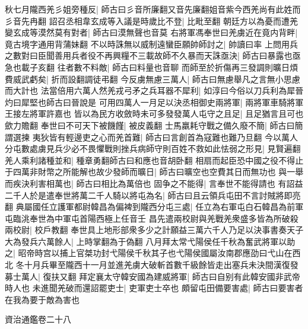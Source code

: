 秋七月隴西羌彡姐旁種反|{
	師古曰彡音所廉翻又音先廉翻姐音紫今西羌尚有此姓而彡音先冉翻}
詔召丞相韋玄成等入議是時歲比不登|{
	比毗至翻}
朝廷方以為憂而遭羌變玄成等漠然莫有對者|{
	師古曰漠無聲也音莫}
右將軍馮奉世曰羌虜近在竟内背畔|{
	竟古境字通用背蒲妹翻}
不以時誅無以威制遠蠻臣願帥師討之|{
	帥讀曰率}
上問用兵之數對曰臣聞善用兵者役不再興糧不三載故師不久暴而天誅亟決|{
	師古曰暴露也亟急也載子亥翻}
往者數不料敵|{
	師古曰料量也音聊}
而師至於折傷再三發調則曠日煩費威武虧矣|{
	折而設翻調徒弔翻}
今反虜無慮三萬人|{
	師古曰無慮舉凡之言無小思慮而大計也}
法當倍用六萬人然羌戎弓矛之兵耳器不犀利|{
	如淳曰今俗以刀兵利為犀晉灼曰犀堅也師古曰晉說是}
可用四萬人一月足以決丞相御史兩將軍|{
	兩將軍車騎將軍王接左將軍許嘉也}
皆以為民方收斂時未可多發發萬人屯守之且足|{
	且足猶言且可也歛力贍翻}
奉世曰不可天下被饑饉|{
	被皮義翻}
士馬羸耗守戰之備久廢不簡|{
	師古曰簡謂選揀}
夷狄皆有輕邊吏之心而羌首難|{
	師古曰言創首為寇難也難乃旦翻}
今以萬人分屯數處虜見兵少必不畏懼戰則挫兵病師守則百姓不救如此怯弱之形見|{
	見賢遍翻}
羌人乘利諸種並和|{
	種章勇翻師古曰和應也音胡卧翻}
相扇而起臣恐中國之役不得止于四萬非財幣之所能解也故少發師而曠日|{
	師古曰曠空也空費其日而無功也}
與一舉而疾決利害相萬也|{
	師古曰相比為萬倍也}
固争之不能得|{
	言奉世不能得請也}
有詔益二千人於是遣奉世將萬二千人騎以將屯為名|{
	師古曰且云領兵屯田不言討賊將即亮翻}
典屬國任立護軍都尉韓昌為偏裨到隴西分屯三處|{
	任立為右軍屯白石韓昌為前軍屯臨洮奉世為中軍屯首陽西極上任音壬}
昌先遣兩校尉與羌戰羌衆盛多皆為所破殺兩校尉|{
	校戶教翻}
奉世具上地形部衆多少之計願益三萬六千人乃足以決事書奏天子大為發兵六萬餘人|{
	上時掌翻為于偽翻}
八月拜太常弋陽侯任千秋為奮武將軍以助之|{
	昭帝時宫以捕上官桀功封弋陽侯千秋其子也弋陽侯國屬汝南郡應劭曰弋山在西北}
冬十月兵畢至隴西十一月並進羌虜大破斬首數千級餘皆走出塞兵未決間漢復發募士萬人|{
	復扶又翻}
拜定襄太守韓安國為建威將軍|{
	師古曰自别有此韓安國非武帝時人也}
未進聞羌破而還詔罷吏士|{
	吏軍吏士卒也}
頗留屯田備要害處|{
	師古曰要害者在我為要于敵為害也}


資治通鑑卷二十八
